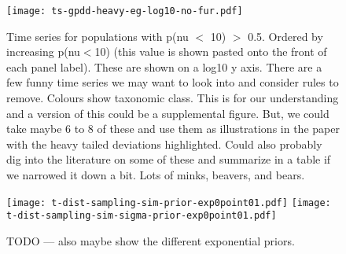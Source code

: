 \documentclass[10pt]{article}
\begin{document}
\clearpage




\begin{figure}[htbp]
\begin{center}
\texttt{[image: ts-gpdd-heavy-eg-log10-no-fur.pdf]}
\caption{Time series for populations with p(nu $<$ 10) $>$ 0.5. Ordered by increasing p(nu$<$10) (this value is shown pasted onto the front of each panel label). These are shown on a log10 y axis. There are a few funny time series we may want to look into and consider rules to remove. Colours show taxonomic class. This is for our understanding and a version of this could be a supplemental figure. But, we could take maybe 6 to 8 of these and use them as illustrations in the paper with the heavy tailed deviations highlighted. Could also probably dig into the literature on some of these and summarize in a table if we narrowed it down a bit. Lots of minks, beavers, and bears.}
\label{default}
\end{center}
\end{figure}

\begin{figure}[htbp]
\begin{center}
\texttt{[image: t-dist-sampling-sim-prior-exp0point01.pdf]}
\texttt{[image: t-dist-sampling-sim-sigma-prior-exp0point01.pdf]}
\caption{TODO --- also maybe show the different exponential priors.}
\label{default}
\end{center}
\end{figure}
\end{document}
